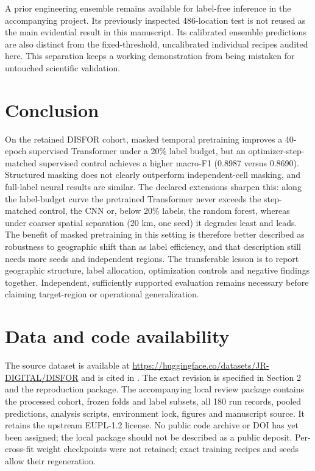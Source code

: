 \documentclass[11pt,a4paper]{article}
\begin{document}
A prior engineering ensemble remains available for label-free inference in the accompanying project. Its previously inspected 486-location test is not reused as the main evidential result in this manuscript. Its calibrated ensemble predictions are also distinct from the fixed-threshold, uncalibrated individual recipes audited here. This separation keeps a working demonstration from being mistaken for untouched scientific validation.

\section{Conclusion}
On the retained DISFOR cohort, masked temporal pretraining improves a 40-epoch supervised Transformer under a 20\% label budget, but an optimizer-step-matched supervised control achieves a higher macro-F1 (0.8987 versus 0.8690). Structured masking does not clearly outperform independent-cell masking, and full-label neural results are similar. The declared extensions sharpen this: along the label-budget curve the pretrained Transformer never exceeds the step-matched control, the CNN or, below 20\% labels, the random forest, whereas under coarser spatial separation (20 km, one seed) it degrades least and leads. The benefit of masked pretraining in this setting is therefore better described as robustness to geographic shift than as label efficiency, and that description still needs more seeds and independent regions. The transferable lesson is to report geographic structure, label allocation, optimization controls and negative findings together. Independent, sufficiently supported evaluation remains necessary before claiming target-region or operational generalization.

\section*{Data and code availability}
The source dataset is available at \url{https://huggingface.co/datasets/JR-DIGITAL/DISFOR} and is cited in \cite{ref1}. The exact revision is specified in Section 2 and the reproduction package. The accompanying local review package contains the processed cohort, frozen folds and label subsets, all 180 run records, pooled predictions, analysis scripts, environment lock, figures and manuscript source. It retains the upstream EUPL-1.2 license. No public code archive or DOI has yet been assigned; the local package should not be described as a public deposit. Per-cross-fit weight checkpoints were not retained; exact training recipes and seeds allow their regeneration.
\end{document}
